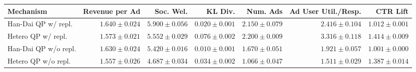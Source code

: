 \begin{tabular}{lrrrrrr}
\hline
Mechanism & Revenue per Ad & Soc. Wel. & KL Div. & Num. Ads & Ad User Util./Resp. & CTR Lift \\
\hline
Han-Dai QP w/ repl. & $1.640 \pm 0.024$ & $5.900 \pm 0.056$ & $0.020 \pm 0.001$ & $2.150 \pm 0.079$ & $2.416 \pm 0.104$ & $1.012 \pm 0.001$ \\
Hetero QP w/ repl. & $1.573 \pm 0.021$ & $5.552 \pm 0.029$ & $0.076 \pm 0.002$ & $2.200 \pm 0.009$ & $3.316 \pm 0.118$ & $1.414 \pm 0.009$ \\
Han-Dai QP w/o repl. & $1.630 \pm 0.024$ & $5.420 \pm 0.016$ & $0.010 \pm 0.001$ & $1.670 \pm 0.051$ & $1.921 \pm 0.057$ & $1.001 \pm 0.000$ \\
Hetero QP w/o repl. & $1.557 \pm 0.026$ & $4.687 \pm 0.034$ & $0.034 \pm 0.002$ & $1.066 \pm 0.047$ & $1.511 \pm 0.029$ & $1.387 \pm 0.014$ \\
\hline
\end{tabular}
